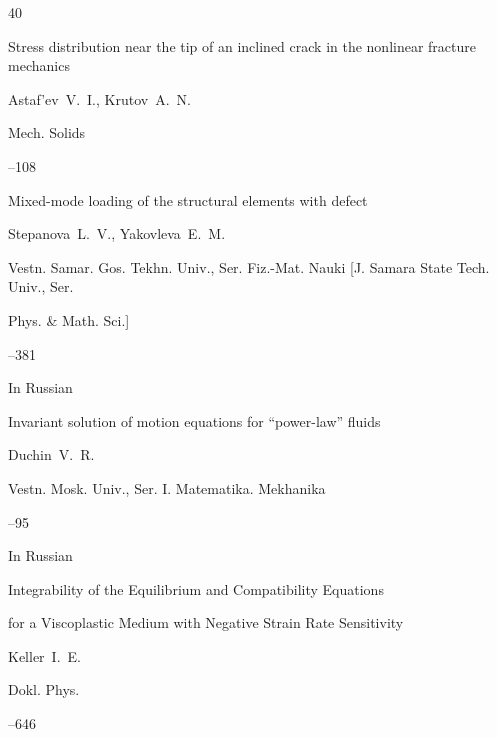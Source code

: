 \begin{thebibliography}{40}




\paper Stress distribution near the tip of an inclined crack in the nonlinear fracture mechanics

\by    Astaf'ev~V.~I., Krutov~A.~N.

\jour Mech. Solids




--108




\paper Mixed-mode loading of the structural elements with defect

\by    Stepanova~L.~V., Yakovleva~E.~M.

\jour Vestn. Samar. Gos. Tekhn. Univ., Ser. Fiz.-Mat. Nauki \rm [J. Samara State Tech. Univ., Ser.

Phys. \& Math. Sci.]




--381


\lang In Russian




\paper Invariant solution of motion equations for ``power-law'' fluids

\by    Duchin~V.~R.

\jour Vestn. Mosk. Univ., Ser. I. Matematika. Mekhanika



--95 

\lang In Russian




\paper Integrability of the Equilibrium and Compatibility Equations

for a Viscoplastic Medium with Negative Strain Rate Sensitivity

\by     Keller~I.~E.

\jour Dokl. Phys.




--646




\end{thebibliography}



\EngDate



\newpage

\Russian



%